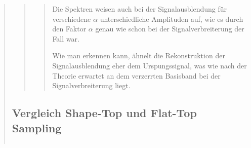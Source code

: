 \begin{quote}
\begin{quote}
\begin{quote}
             Die Spektren weisen auch bei der Signalausblendung für verschiedene $\alpha$ unterschiedliche Amplituden
             auf, wie es durch den Faktor $\alpha$ genau wie schon bei der Signalverbreiterung der Fall war.
             
             
             Wie man erkennen kann, ähnelt die Rekonstruktion der Signalausblendung eher dem Urspungssignal, was wie
             nach der Theorie erwartet an dem verzerrten Basisband bei der Signalverbreiterung liegt.
             
             
        \end{quote}
        
        
        
    \end{quote}
    
    \subsection{Vergleich Shape-Top und Flat-Top Sampling}
      \begin{quote}
      
      \begin{center}
            \begin{tabular}{ll}
            

\end{tabular}
\end{center}
\end{quote}
\end{quote}
